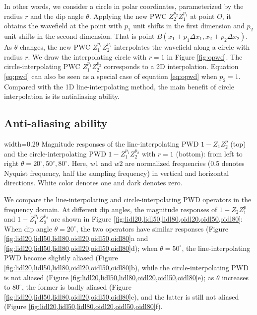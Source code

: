 In other words, 
we consider a circle in polar coordinates,
parameterized by the radius $r$ and the dip angle $\theta$.
Applying the new PWC $Z_2^{p_2}Z_1^{p_1}$ at point $O$, 
it obtains the wavefield at the point with 
$p_1$ unit shifts in the first dimension and
$p_2$ unit shifts in the second dimension.
That is point $B(x_1+p_1\Delta x_1,x_2+p_2\Delta x_2)$.
As $\theta$ changes,
the new PWC $Z_1^{p_1}Z_2^{p_2}$ interpolates the wavefield
along a circle with radius $r$.
We draw the interpolating circle with $r=1$ in Figure \ref{fig:opwd}.
The circle-interpolating PWC $Z_1^{p_1}Z_2^{p_2}$ 
corresponds to a 2D interpolation.
Equation \ref{eq:pwd} can also be seen as 
a special case of equation \ref{eq:opwd} when $p_2=1$.
Compared with the 1D line-interpolating method,
the main benefit of circle interpolation 
is its antialiasing ability.

\subsection{Anti-aliasing ability}


{width=0.29\textwidth}{
Magnitude responses of the line-interpolating PWD $1-Z_1Z_2^p$ (top)
and the circle-interpolating PWD 
$1-Z_1^{p_1}Z_2^{p_2}$ with $r=1$ (bottom):
from left to right $\theta=20^\circ,50^\circ,80^\circ$.
Here, $w1$ and $w2$ are normalized frequencies
(0.5 denotes Nyquist frequency, half the sampling frequency)
in vertical and horizontal directions.
White color denotes one and dark denotes zero.
}

We compare the line-interpolating and circle-interpolating PWD operators
in the frequency domain.
At different dip angles,
the magnitude responses of $1-Z_2Z_1^p$ and $1-Z_1^{p_1}Z_2^{p_2}$
are shown in Figure \ref{fig:lidl20,lidl50,lidl80,oidl20,oidl50,oidl80}:
When dip angle $\theta=20^\circ$, the two operators have similar responses
(Figure \ref{fig:lidl20,lidl50,lidl80,oidl20,oidl50,oidl80}a and
\ref{fig:lidl20,lidl50,lidl80,oidl20,oidl50,oidl80}d);
when 
$\theta=50^\circ$, the line-interpolating PWD become slightly aliased
(Figure \ref{fig:lidl20,lidl50,lidl80,oidl20,oidl50,oidl80}b),
while the circle-interpolating PWD 
is not aliased
(Figure \ref{fig:lidl20,lidl50,lidl80,oidl20,oidl50,oidl80}e);
as $\theta$ increases to $80^\circ$, the former is badly aliased
(Figure \ref{fig:lidl20,lidl50,lidl80,oidl20,oidl50,oidl80}c),
and the latter is still not aliased
(Figure \ref{fig:lidl20,lidl50,lidl80,oidl20,oidl50,oidl80}f).

